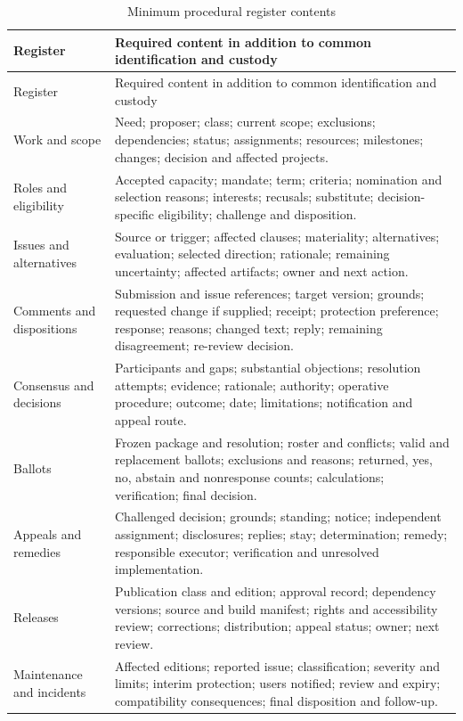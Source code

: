\documentclass[11pt,a4paper]{article}
\begin{document}
\begin{longtable}{@{}L{0.23\textwidth}L{0.67\textwidth}@{}}
\caption{Minimum procedural register contents}\label{tab:d1-registers}\\
\toprule Register & Required content in addition to common identification and custody \\
\midrule\endfirsthead
\toprule Register & Required content in addition to common identification and custody \\
\midrule\endhead
Work and scope & Need; proposer; class; current scope; exclusions; dependencies; status; assignments; resources; milestones; changes; decision and affected projects. \\
Roles and eligibility & Accepted capacity; mandate; term; criteria; nomination and selection reasons; interests; recusals; substitute; decision-specific eligibility; challenge and disposition. \\
Issues and alternatives & Source or trigger; affected clauses; materiality; alternatives; evaluation; selected direction; rationale; remaining uncertainty; affected artifacts; owner and next action. \\
Comments and dispositions & Submission and issue references; target version; grounds; requested change if supplied; receipt; protection preference; response; reasons; changed text; reply; remaining disagreement; re-review decision. \\
Consensus and decisions & Participants and gaps; substantial objections; resolution attempts; evidence; rationale; authority; operative procedure; outcome; date; limitations; notification and appeal route. \\
Ballots & Frozen package and resolution; roster and conflicts; valid and replacement ballots; exclusions and reasons; returned, yes, no, abstain and nonresponse counts; calculations; verification; final decision. \\
Appeals and remedies & Challenged decision; grounds; standing; notice; independent assignment; disclosures; replies; stay; determination; remedy; responsible executor; verification and unresolved implementation. \\
Releases & Publication class and edition; approval record; dependency versions; source and build manifest; rights and accessibility review; corrections; distribution; appeal status; owner; next review. \\
Maintenance and incidents & Affected editions; reported issue; classification; severity and limits; interim protection; users notified; review and expiry; compatibility consequences; final disposition and follow-up. \\
\bottomrule
\end{longtable}
\end{document}
